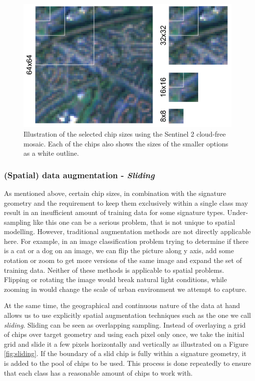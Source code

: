 \begin{figure}
    \centering
    \includegraphics[width=.8\linewidth]{fig/chips.png}
    \caption{Illustration of the selected chip sizes using the Sentinel 2 cloud-free mosaic. Each of the chips also shows the sizes of the smaller options as a white outline.}
    \label{fig:chips}
\end{figure}



\subsubsection{(Spatial) data augmentation - \textit{Sliding}}



As mentioned above, certain chip sizes, in combination with the signature
geometry and the
requirement to keep them exclusively within a single class may result in an
insufficient amount of training data for some signature types. Under-sampling like this
one can be a serious problem, that is not unique to spatial modelling. However,
traditional augmentation methods are not directly applicable here. For example, in an
image classification problem trying to determine if there is a cat or a dog on an image,
we can flip the picture along y axis, add some rotation or zoom to get more versions of
the same image and expand the set of training data. Neither of these methods is
applicable to spatial problems. Flipping or rotating the image would break
natural light conditions, while zooming in would change the scale of urban environment
we attempt to capture.

At the same time, the geographical and continuous nature of the data at hand
allows us to use explicitly spatial augmentation techniques such as the one we
call \textit{sliding}.
Sliding can be seen as overlapping sampling. Instead of overlaying a grid of chips over
target geometry and using each pixel only once, we take the initial grid and slide it a
few pixels horizontally and vertically as illustrated on a Figure \ref{fig:sliding}. If
the boundary of a slid chip is fully within a signature geometry, it is added to the
pool of chips to be used. This process is done repeatedly to ensure that each class has
a reasonable amount of chips to work with.


